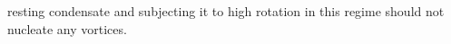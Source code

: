 resting condensate and subjecting it to high rotation in this regime should not nucleate any vortices.


